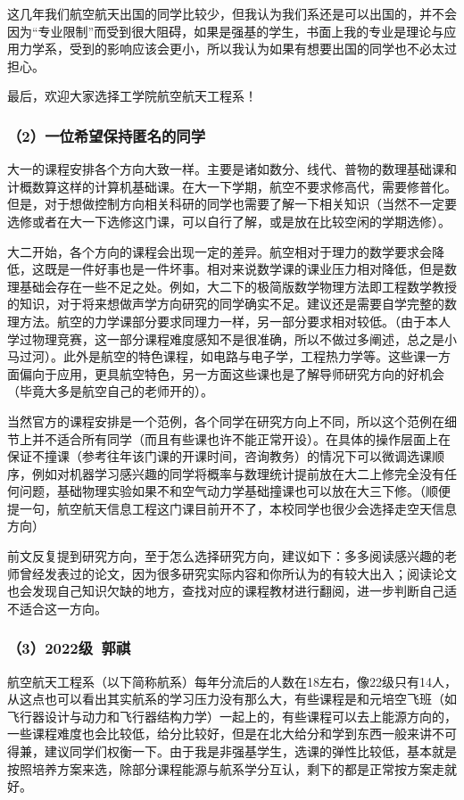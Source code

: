 \documentclass[11pt,oneside]{book}
\begin{document}
这几年我们航空航天出国的同学比较少，但我认为我们系还是可以出国的，并不会因为“专业限制”而受到很大阻碍，如果是强基的学生，书面上我的专业是理论与应用力学系，受到的影响应该会更小，所以我认为如果有想要出国的同学也不必太过担心。

最后，欢迎大家选择工学院航空航天工程系！

\subsubsection{（2）一位希望保持匿名的同学}
大一的课程安排各个方向大致一样。主要是诸如数分、线代、普物的数理基础课和计概数算这样的计算机基础课。在大一下学期，航空不要求修高代，需要修普化。但是，对于想做控制方向相关科研的同学也需要了解一下相关知识（当然不一定要选修或者在大一下选修这门课，可以自行了解，或是放在比较空闲的学期选修）。

大二开始，各个方向的课程会出现一定的差异。航空相对于理力的数学要求会降低，这既是一件好事也是一件坏事。相对来说数学课的课业压力相对降低，但是数理基础会存在一些不足之处。例如，大二下的极简版数学物理方法即工程数学教授的知识，对于将来想做声学方向研究的同学确实不足。建议还是需要自学完整的数理方法。航空的力学课部分要求同理力一样，另一部分要求相对较低。（由于本人学过物理竞赛，这一部分课程难度感知不是很准确，所以不做过多阐述，总之是小马过河）。此外是航空的特色课程，如电路与电子学，工程热力学等。这些课一方面偏向于应用，更具航空特色，另一方面这些课也是了解导师研究方向的好机会（毕竟大多是航空自己的老师开的）。

当然官方的课程安排是一个范例，各个同学在研究方向上不同，所以这个范例在细节上并不适合所有同学（而且有些课也许不能正常开设）。在具体的操作层面上在保证不撞课（参考往年该门课的开课时间，咨询教务）的情况下可以微调选课顺序，例如对机器学习感兴趣的同学将概率与数理统计提前放在大二上修完全没有任何问题，基础物理实验如果不和空气动力学基础撞课也可以放在大三下修。（顺便提一句，航空航天信息工程这门课目前开不了，本校同学也很少会选择走空天信息方向）

前文反复提到研究方向，至于怎么选择研究方向，建议如下：多多阅读感兴趣的老师曾经发表过的论文，因为很多研究实际内容和你所认为的有较大出入；阅读论文也会发现自己知识欠缺的地方，查找对应的课程教材进行翻阅，进一步判断自己适不适合这一方向。

\subsubsection{（3）2022级\ 郭祺}
航空航天工程系（以下简称航系）每年分流后的人数在18左右，像22级只有14人，从这点也可以看出其实航系的学习压力没有那么大，有些课程是和元培空飞班（如飞行器设计与动力和飞行器结构力学）一起上的，有些课程可以去上能源方向的，一些课程难度也会比较低，给分比较好，但是在北大给分和学到东西一般来讲不可得兼，建议同学们权衡一下。由于我是非强基学生，选课的弹性比较低，基本就是按照培养方案来选，除部分课程能源与航系学分互认，剩下的都是正常按方案走就好。 
\end{document}
